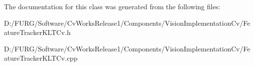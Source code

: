 The documentation for this class was generated from the following files\+:\begin{DoxyCompactItemize}
\item 
D\+:/\+F\+U\+R\+G/\+Software/\+Cv\+Works\+Release1/\+Components/\+Vision\+Implementation\+Cv/Feature\+Tracker\+K\+L\+T\+Cv.\+h\item 
D\+:/\+F\+U\+R\+G/\+Software/\+Cv\+Works\+Release1/\+Components/\+Vision\+Implementation\+Cv/Feature\+Tracker\+K\+L\+T\+Cv.\+cpp\end{DoxyCompactItemize}
